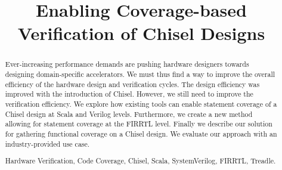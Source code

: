\documentclass[conference]{IEEEtran}
\begin{document}
%
\title{Enabling Coverage-based Verification of Chisel Designs}
\author{
}
%
%
%

%
%
\maketitle              %
%
\begin{abstract}
Ever-increasing performance demands are pushing hardware designers towards designing domain-specific accelerators. We must thus find a way to improve the overall efficiency of the hardware design and verification cycles. The design efficiency was improved with the introduction of Chisel. However, we still need to improve the verification efficiency.
We explore how existing tools can enable statement coverage of a Chisel design at Scala and Verilog levels. Furthermore, we create a new method allowing for statement coverage at the FIRRTL level. Finally we describe our solution for gathering functional coverage on a Chisel design.
We evaluate our approach with an industry-provided use case.

\begin{IEEEkeywords}
Hardware Verification, Code Coverage, Chisel, Scala, SystemVerilog, FIRRTL, Treadle.
\end{IEEEkeywords}

\end{abstract}
\end{document}
